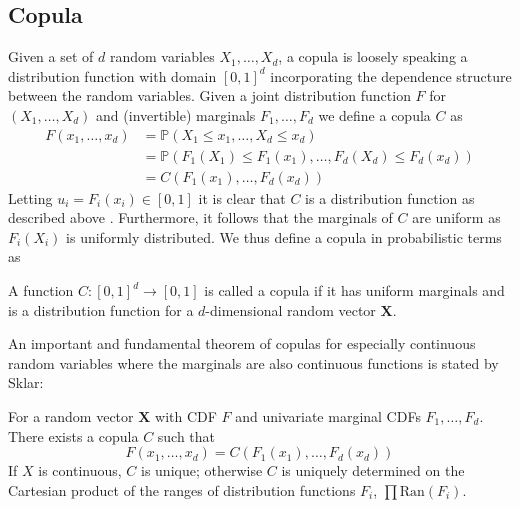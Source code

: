 \documentclass[../Thesis.tex]{subfiles}
\begin{document}
\subsection{Copula}
Given a set of $d$ random variables $X_1,\dots, X_d$, a copula is loosely speaking a distribution function with domain $[0,1]^d$ incorporating the dependence structure between the random variables. Given a joint distribution function $F$ for $\left(X_1,\dots, X_d\right)$ and (invertible) marginals $F_1,\dots,F_d$ we define a copula $C$ as
\begin{align*}
    F(x_1,\dots,x_d) & = \mathbb{P}\left(X_1\leq x_1,\dots, X_d\leq x_d\right)                                                                 \\
                     & = \mathbb{P}\left(F_1\left(X_1\right)\leq F_1\left(x_1\right),\dots, F_d\left(X_d\right)\leq F_d\left(x_d\right)\right) \\
                     & = C\left(F_1\left(x_1\right),\dots,F_d\left(x_d\right)\right)
\end{align*}
Letting $u_i = F_i\left(x_i\right) \in [0,1]$ it is clear that $C$ is a distribution function as described above \cite{Copula-handbook}. Furthermore, it follows that the marginals of $C$ are uniform as $F_i\left(X_i\right)$ is uniformly distributed. We thus define a copula in probabilistic terms as
\begin{definition}[Copula]\label{def:copula}
    A function $C:[0,1]^d \to [0,1]$ is called a copula if it has uniform marginals and is a distribution function for a $d$-dimensional random vector $\mathbf{X}$.
\end{definition}
An important and fundamental theorem of copulas for especially continuous random variables where the marginals are also continuous functions is stated by Sklar:
\begin{theorem} \label{thm: Sklar}
    For a random vector $\boldsymbol X$ with CDF $F$ and univariate marginal CDFs $F_1, \dots, F_d$. There exists a copula $C$ such that
    \begin{equation}\label{eq:sklar}
        F(x_1,\dots,x_d) = C(F_1(x_1), \dots, F_d(x_d))
    \end{equation}
    If $X$ is continuous, $C$ is unique; otherwise $C$ is uniquely determined on the Cartesian product of the ranges of distribution functions $F_i$, $\prod \text{Ran}\left(F_i\right)$.
\end{theorem}
\end{document}
